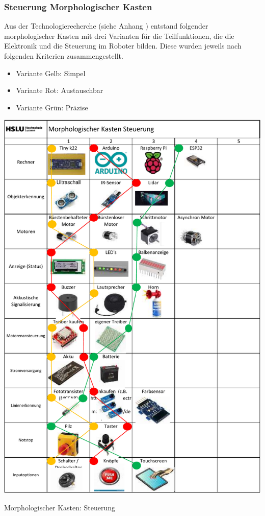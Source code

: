 \subsubsection*{Steuerung Morphologischer Kasten}


Aus der Technologierecherche (siehe Anhang ) entstand folgender morphologischer Kasten mit drei Varianten für die Teilfunktionen, die die Elektronik und die Steuerung im Roboter bilden. Diese wurden jeweils nach folgenden Kriterien zusammengestellt.

\begin{itemize}
    \item Variante Gelb: Simpel
    \item Variante Rot: Austauschbar
    \item Variante Grün: Präzise
\end{itemize}


\begin{table}[H]
\centering
\includegraphics[width=\textwidth -5mm]{assets/MK_Elektrotechnik.pdf}
\caption{Morphologischer Kasten: Steuerung}
\label{table:mk-elektrotechnik}
\end{table}

